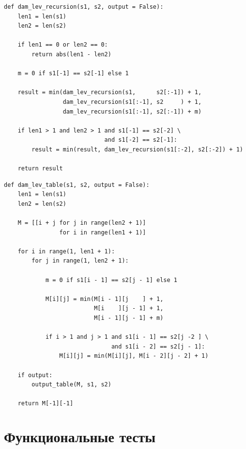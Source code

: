 \documentclass[a4paper,14pt, unknownkeysallowed]{extreport}
\begin{document}
\clearpage

\begin{center}
\captionsetup{justification=raggedright,singlelinecheck=off}
\begin{lstlisting}[label=lst:dam_lev_recursion,caption=Функция нахождения расстояния Дамерау–Левенштейна рекурсивно]
def dam_lev_recursion(s1, s2, output = False):
    len1 = len(s1)
    len2 = len(s2)

    if len1 == 0 or len2 == 0:
        return abs(len1 - len2)

    m = 0 if s1[-1] == s2[-1] else 1

    result = min(dam_lev_recursion(s1,      s2[:-1]) + 1,
                 dam_lev_recursion(s1[:-1], s2     ) + 1,
                 dam_lev_recursion(s1[:-1], s2[:-1]) + m)

    if len1 > 1 and len2 > 1 and s1[-1] == s2[-2] \
                             and s1[-2] == s2[-1]:
        result = min(result, dam_lev_recursion(s1[:-2], s2[:-2]) + 1)

    return result
\end{lstlisting}
\end{center}

\clearpage

\begin{center}
\captionsetup{justification=raggedright,singlelinecheck=off}
\begin{lstlisting}[label=lst:dam_lev_table,caption=Функция нахождения расстояния Дамерау–Левенштейна итеративно]
def dam_lev_table(s1, s2, output = False):
	len1 = len(s1)
	len2 = len(s2)

	M = [[i + j for j in range(len2 + 1)] 
				for i in range(len1 + 1)]
	
	for i in range(1, len1 + 1):
		for j in range(1, len2 + 1):

			m = 0 if s1[i - 1] == s2[j - 1] else 1

			M[i][j] = min(M[i - 1][j    ] + 1,
						  M[i    ][j - 1] + 1,
						  M[i - 1][j - 1] + m)

			if i > 1 and j > 1 and s1[i - 1] == s2[j -2 ] \
							   and s1[i - 2] == s2[j - 1]:
				M[i][j] = min(M[i][j], M[i - 2][j - 2] + 1)

	if output:  
		output_table(M, s1, s2)

	return M[-1][-1]
\end{lstlisting}
\end{center}

\clearpage

\section{Функциональные тесты}
\end{document}
